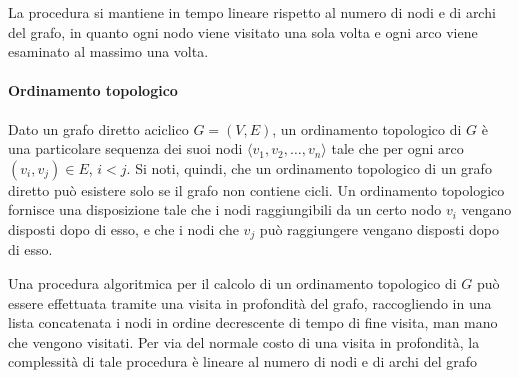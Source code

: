 


La procedura si mantiene in tempo lineare rispetto al numero di nodi e di archi del grafo, in quanto
ogni nodo viene visitato una sola volta e ogni arco viene esaminato al massimo una volta.

\paragraph{Ordinamento topologico}
Dato un grafo diretto aciclico $G = (V, E)$, un ordinamento topologico di $G$ \`e una particolare sequenza
dei suoi nodi $\langle v_1, v_2, \ldots, v_n \rangle$ tale che per ogni arco $(v_i, v_j) \in E$, $i < j$.
Si noti, quindi, che un ordinamento topologico di un grafo diretto pu\`o esistere solo se il grafo non contiene
cicli.
Un ordinamento topologico fornisce una disposizione tale che i nodi raggiungibili da un certo nodo $v_i$ vengano
disposti dopo di esso, e che i nodi che $v_j$ pu\`o raggiungere vengano disposti dopo di esso.

Una procedura algoritmica per il calcolo di un ordinamento topologico di $G$ pu\`o essere effettuata tramite una
visita in profondit\`a del grafo, raccogliendo in una lista concatenata i nodi in ordine decrescente di tempo
di fine visita, man mano che vengono visitati.
Per via del normale costo di una visita in profondit\`a, la complessit\`a di tale procedura \`e lineare al
numero di nodi e di archi del grafo \newline



